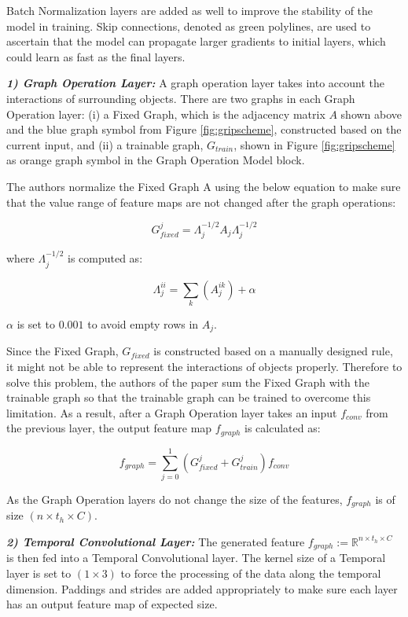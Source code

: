 \tab Batch Normalization layers are added as well to improve the stability of the model in training. Skip connections, denoted as green polylines, are used to ascertain that the model can propagate larger gradients to initial layers, which could learn as fast as the final layers.

\textbf{\textit{1) Graph Operation Layer:}} A graph operation layer takes into account the interactions of surrounding objects. There are two graphs in each Graph Operation layer: (i) a Fixed Graph, which is the adjacency matrix \(A\) shown above and the blue graph symbol from Figure \ref{fig:gripscheme}, constructed based on the current input, and (ii) a trainable graph, \(G_{train}\), shown in Figure \ref{fig:gripscheme} as orange graph symbol in the Graph Operation Model block.

\tab The authors normalize the Fixed Graph A using the below equation to make sure that the value range of feature maps are not changed after the graph operations: 

\begin{equation}
    G^j_{fixed} = \Lambda^{-1/2}_j A_j \Lambda^{-1/2}_j
\end{equation}

where \(\Lambda^{-1/2}_j\) is computed as:

\begin{equation}
    \Lambda^{ii}_j = \sum_k (A^{ik}_j) + \alpha
\end{equation}

\(\alpha\) is set to \(0.001\) to avoid empty rows in \(A_j\).

\tab Since the Fixed Graph, \(G_{fixed}\) is constructed based on a manually designed rule, it might not be able to represent the interactions of objects properly. Therefore to solve this problem, the authors of the paper sum the Fixed Graph with the trainable graph so that the trainable graph can be trained to overcome this limitation. As a result, after a Graph Operation layer takes an input \(f_{conv}\) from the previous layer, the output feature map \(f_{graph}\) is calculated as: 

\begin{equation}
    f_{graph} = \sum_{j=0}^1(G^j_{fixed} + G^j_{train})f_{conv}
\end{equation}

As the Graph Operation layers do not change the size of the features, \(f_{graph}\) is of size \((n \times t_h \times C)\). 

\textbf{\textit{2) Temporal Convolutional Layer:}} The generated feature \(f_{graph} := \mathbb{R}^{n \times t_h \times C}\) is then fed into a Temporal Convolutional layer. The kernel size of a Temporal layer is set to \((1 \times 3)\) to force the processing of the data along the temporal dimension. Paddings and strides are added appropriately to make sure each layer has an output feature map of expected size. 


